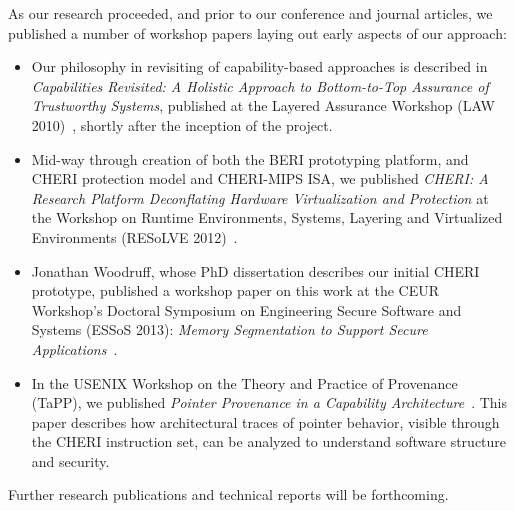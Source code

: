 As our research proceeded, and prior to our conference and journal articles,
we published a number of workshop papers laying out early aspects of our
approach:

\begin{itemize}
\item Our philosophy in revisiting of capability-based approaches is described
  in {\em Capabilities Revisited: A Holistic Approach to Bottom-to-Top
  Assurance of Trustworthy Systems}, published at the Layered Assurance
  Workshop (LAW 2010)~\cite{NeumannWatson10LAW}, shortly after the inception
  of the project.

\item Mid-way through creation of both the BERI prototyping platform, and
  CHERI protection model and CHERI-MIPS ISA, we published {\em CHERI: A
  Research Platform Deconflating Hardware Virtualization and Protection} at
  the Workshop on Runtime Environments, Systems, Layering and Virtualized
  Environments (RESoLVE 2012)~\cite{watson:cheriresolve2012}.

\item Jonathan Woodruff, whose PhD dissertation describes our initial CHERI
  prototype, published a workshop paper on this work at the CEUR Workshop's
  Doctoral Symposium on Engineering Secure Software and Systems (ESSoS 2013):
  \textit{Memory Segmentation to Support Secure
  Applications}~\cite{NeumannWatson10LAW}.

\item In the USENIX Workshop on the Theory and Practice of Provenance (TaPP),
  we published {\em Pointer Provenance in a Capability
  Architecture}~\cite{mazzinghi:pointer-provenance}.
  This paper describes how architectural traces of pointer behavior, visible
  through the CHERI instruction set, can be analyzed to understand software
  structure and security.
\end{itemize}

\noindent
Further research publications and technical reports will be forthcoming.
